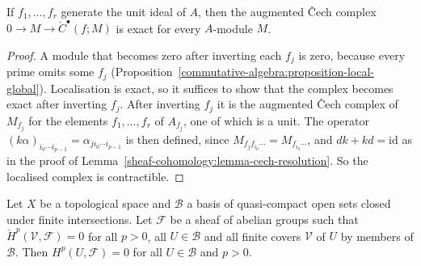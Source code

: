 \begin{lemma}\label{coherent-cohomology:lemma-cech-exact}
If $f_1, \ldots, f_r$ generate the unit ideal of $A$, then the augmented \v{C}ech complex $0 \to M \to \check C^\bullet(f; M)$ is exact for every $A$-module $M$.
\end{lemma}

\begin{proof}
A module that becomes zero after inverting each $f_j$ is zero, because every prime omits some $f_j$
(Proposition~\ref{commutative-algebra:proposition-local-global}). Localisation is exact, so it suffices to show that the complex becomes exact after
inverting $f_j$. After inverting $f_j$ it is the augmented \v{C}ech complex of $M_{f_j}$ for the elements $f_1, \ldots, f_r$ of $A_{f_j}$, one of which is a unit.
The operator $(k\alpha)_{i_0 \cdots i_{p-1}} = \alpha_{ji_0 \cdots i_{p-1}}$ is then defined, since $M_{f_jf_{i_0} \cdots} = M_{f_{i_0} \cdots}$, and
$dk + kd = \mathrm{id}$ as in the proof of Lemma~\ref{sheaf-cohomology:lemma-cech-resolution}. So the localised complex is contractible.
\end{proof}

\begin{lemma}[Cartan]\label{coherent-cohomology:lemma-cartan}
Let $X$ be a topological space and $\mathcal{B}$ a basis of quasi-compact open sets closed under finite intersections. Let $\mathcal{F}$ be a sheaf of
abelian groups such that $\check H^p(\mathcal{V}, \mathcal{F}) = 0$ for all $p > 0$, all $U \in \mathcal{B}$ and all finite covers $\mathcal{V}$ of $U$ by members of
$\mathcal{B}$. Then $H^p(U, \mathcal{F}) = 0$ for all $U \in \mathcal{B}$ and $p > 0$.
\end{lemma}

